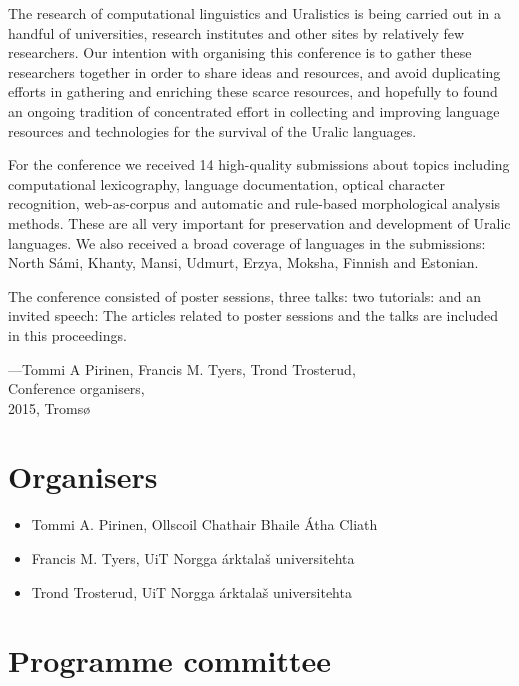 \documentclass[b5paper]{book}
\begin{document}
The research of computational linguistics and Uralistics is being carried out
in a handful of universities, research institutes and other sites by
relatively few researchers. Our intention with organising this conference is to
gather these researchers together in order to share ideas and resources, and
avoid duplicating efforts in gathering and enriching these scarce resources,
and hopefully to found an ongoing tradition of concentrated effort in
collecting and improving language resources and technologies for the survival
of the Uralic languages.

For the conference we received 14 high-quality submissions about topics
including computational lexicography, language documentation, optical character
recognition, web-as-corpus and automatic and rule-based morphological analysis
methods.  These are all very important for preservation and development of
Uralic languages. We also received a broad coverage of languages in the
submissions: North Sámi, Khanty, Mansi, Udmurt, Erzya, Moksha, Finnish and
Estonian.

The conference consisted of poster sessions, three talks:
two tutorials: and an invited speech:
The articles related to poster sessions and the talks are included in this
proceedings.

\noindent ---Tommi A Pirinen, Francis M. Tyers, Trond Trosterud,\\
Conference organisers,\\
2015, Tromsø


\chapter*{Organisers}

\begin{itemize}
    \item Tommi A. Pirinen, Ollscoil Chathair Bhaile Átha Cliath
    \item Francis M. Tyers, UiT Norgga árktalaš universitehta
    \item Trond Trosterud, UiT Norgga árktalaš universitehta
\end{itemize}

\chapter*{Programme committee}
\end{document}
